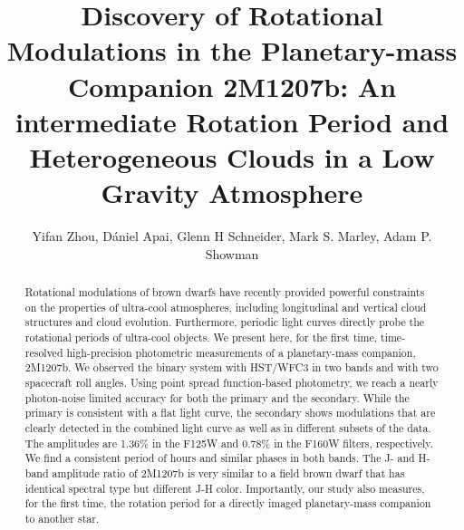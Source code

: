 \documentclass[apj]{emulateapj}
\begin{document}
\title{Discovery of Rotational Modulations in the Planetary-mass
  Companion 2M1207\lowercase{b}: An intermediate Rotation Period and Heterogeneous Clouds in a Low
  Gravity Atmosphere}
\author{Yifan Zhou, D\'aniel Apai,
  Glenn H Schneider,  Mark S. Marley,
  Adam P. Showman}


\begin{abstract}
  Rotational modulations of brown dwarfs have recently provided
  powerful constraints on the properties of ultra-cool atmospheres,
  including longitudinal and vertical cloud structures and cloud
  evolution. Furthermore, periodic light curves directly probe the
  rotational periods of ultra-cool objects.  We present here, for the
  first time, time-resolved high-precision photometric measurements of
  a planetary-mass companion, 2M1207b.  We observed the binary
  system with HST/WFC3 in two bands and with two spacecraft roll
  angles. Using point spread function-based photometry, we reach a
  nearly photon-noise limited accuracy for both the primary and the
  secondary. While the primary is consistent with a flat light curve,
  the secondary shows modulations that are clearly detected in the
  combined light curve as well as in different subsets of the data.
  The amplitudes are 1.36\% in the F125W and 0.78\% in the F160W
  filters, respectively. We find a consistent period of
  \period{} hours and
  similar phases in both bands. The J- and H-band amplitude ratio of
  2M1207b is very similar to a field brown dwarf that has identical
  spectral type but different J-H color.  Importantly, our study also
  measures, for the first time, the rotation period for a directly 
  imaged planetary-mass companion to another star.
\end{abstract}

\maketitle
%
\end{document}
